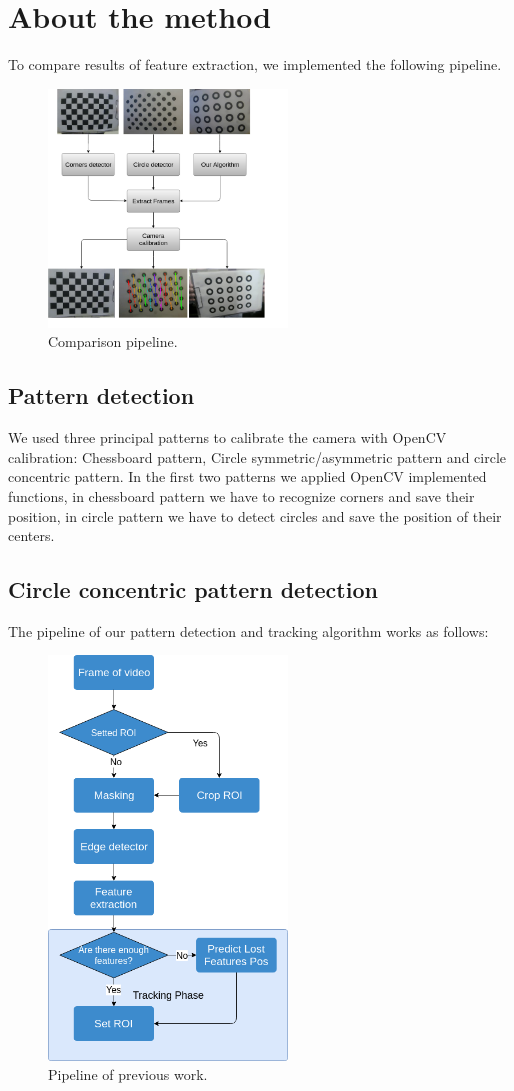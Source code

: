 \documentclass[journal]{IEEEtran}
\begin{document}
\section{About the method}
To compare results of feature extraction, we implemented the following pipeline.

\begin{figure}[H]
\centering
\includegraphics[width=2.5in]{_img/img_report3_pipeline.png}
\caption{Comparison pipeline.}
\end{figure}

\subsection{ Pattern detection }
We used three principal patterns to calibrate the camera with OpenCV calibration: Chessboard pattern, Circle symmetric/asymmetric pattern and circle concentric pattern. In the first two patterns we applied OpenCV implemented functions, in chessboard pattern we have to recognize corners and save their position, in circle pattern we have to detect circles and save the position of their centers.

\subsection{Circle concentric pattern detection}
The pipeline of our pattern detection and tracking algorithm works as follows:

\begin{figure}[H]
\centering
\includegraphics[width=2.5in]{_img/algorithm_overview.png}
\caption{Pipeline of previous work.}
\end{figure}
\end{document}
